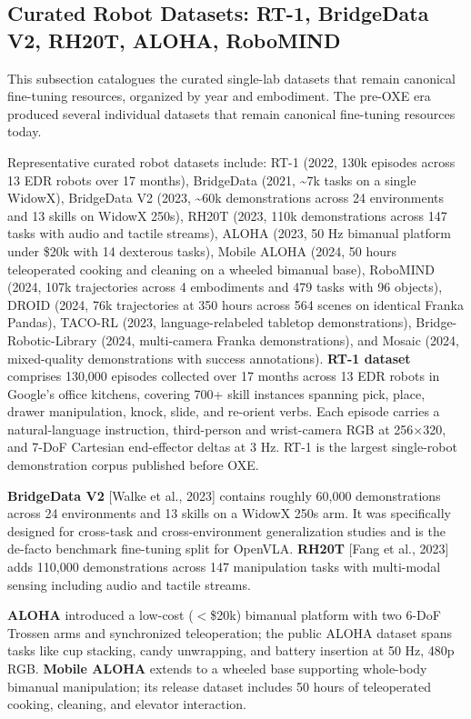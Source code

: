 \documentclass{article}
\begin{document}
\subsection{Curated Robot Datasets: RT-1, BridgeData V2, RH20T, ALOHA, RoboMIND}\label{curated-robot-datasets-rt-1-bridgedata-v2-rh20t-aloha-robomind}

This subsection catalogues the curated single-lab datasets that remain canonical fine-tuning resources, organized by year and embodiment. The pre-OXE era produced several individual datasets that remain canonical fine-tuning resources today.

Representative curated robot datasets include: RT-1 (2022, 130k episodes across 13 EDR robots over 17 months), BridgeData (2021, \textasciitilde7k tasks on a single WidowX), BridgeData V2 (2023, \textasciitilde60k demonstrations across 24 environments and 13 skills on WidowX 250s), RH20T (2023, 110k demonstrations across 147 tasks with audio and tactile streams), ALOHA (2023, 50 Hz bimanual platform under \$20k with 14 dexterous tasks), Mobile ALOHA (2024, 50 hours teleoperated cooking and cleaning on a wheeled bimanual base), RoboMIND (2024, 107k trajectories across 4 embodiments and 479 tasks with 96 objects), DROID (2024, 76k trajectories at 350 hours across 564 scenes on identical Franka Pandas), TACO-RL (2023, language-relabeled tabletop demonstrations), Bridge-Robotic-Library (2024, multi-camera Franka demonstrations), and Mosaic (2024, mixed-quality demonstrations with success annotations). \textbf{RT-1 dataset} \cite{brohan2023rt2visionlanguagea} comprises 130,000 episodes collected over 17 months across 13 EDR robots in Google's office kitchens, covering 700+ skill instances spanning pick, place, drawer manipulation, knock, slide, and re-orient verbs. Each episode carries a natural-language instruction, third-person and wrist-camera RGB at 256×320, and 7-DoF Cartesian end-effector deltas at 3 Hz. RT-1 is the largest single-robot demonstration corpus published before OXE.

\textbf{BridgeData V2} {[}Walke et al., 2023{]} contains roughly 60,000 demonstrations across 24 environments and 13 skills on a WidowX 250s arm. It was specifically designed for cross-task and cross-environment generalization studies and is the de-facto benchmark fine-tuning split for OpenVLA. \textbf{RH20T} {[}Fang et al., 2023{]} adds 110,000 demonstrations across 147 manipulation tasks with multi-modal sensing including audio and tactile streams.

\textbf{ALOHA} \cite{zhao2023learningfinegraine} introduced a low-cost (\(<\)\$20k) bimanual platform with two 6-DoF Trossen arms and synchronized teleoperation; the public ALOHA dataset spans tasks like cup stacking, candy unwrapping, and battery insertion at 50 Hz, 480p RGB. \textbf{Mobile ALOHA} \cite{fu2024mobilealohalearnin} extends to a wheeled base supporting whole-body bimanual manipulation; its release dataset includes 50 hours of teleoperated cooking, cleaning, and elevator interaction.
\end{document}
